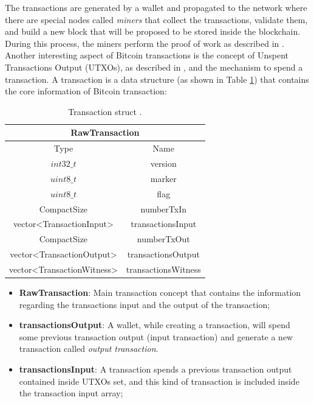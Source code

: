 The transactions are generated by a wallet and propagated to the network
where there are special nodes called \emph{miners} that collect the transactions,
validate them, and build a new block that will be proposed to be stored inside 
the blockchain. During this process, the miners perform the proof of work as 
described in \cite{Palazzo_Estrazione_di_Informazioni_2021}.
Another interesting aspect of Bitcoin transactions is the concept of 
Unspent Transactions Output (UTXOs), as described in \cite{nakamoto2009bitcoin},
and the mechanism to spend a transaction.
A transaction is a data structure (as shown in Table \ref{tab:rawtxbitcoinc}) that contains the core information
of Bitcoin transaction: 

\begin{table}[H]
    \centering\small
       \begin{tabular}{|c|c|}
        \hline
        \multicolumn{2}{|c|}{\textbf{RawTransaction}} \\
        \hline
        \multicolumn{1}{|c|}{Type} & \multicolumn{1}{c|}{Name} \\       
        \hline \hline
        $int32\_t$ & version   \\
        \hline
        $uint8\_t$ & marker \\
        \hline
        $uint8\_t$ & flag \\
        \hline
        CompactSize & numberTxIn \\
        \hline
        vector<TransactionInput> & transactionsInput \\
        \hline
        CompactSize & numberTxOut \\
        \hline
        vector<TransactionOutput> & transactionsOutput \\
        \hline
        vector<TransactionWitness> & transactionsWitness \\
        \hline
    \end{tabular}   
    \caption{Transaction struct \cite{Palazzo_Estrazione_di_Informazioni_2021}.\label{tab:rawtxbitcoinc}}
\end{table}

\begin{itemize}
    \item {\bf RawTransaction}: Main transaction concept that contains the information
        regarding the transactions input and the output of the transaction;
    \item {\bf transactionsOutput}: A wallet, while creating a transaction, will spend some previous
        transaction output (input transaction) and generate a new transaction called \emph{output transaction}.
    \item {\bf transactionsInput}: A transaction spends a previous transaction output contained
        inside UTXOs set, and this kind of transaction is included inside
        the transaction input array;
    \end{itemize}


